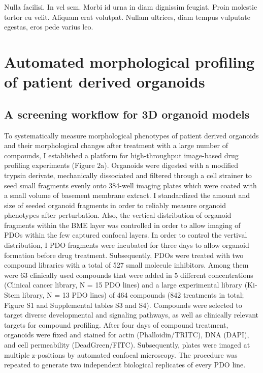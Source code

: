 \begin{savequote}[75mm]
Nulla facilisi. In vel sem. Morbi id urna in diam dignissim feugiat. Proin molestie tortor eu velit. Aliquam erat volutpat. Nullam ultrices, diam tempus vulputate egestas, eros pede varius leo.
\end{savequote}


\chapter{Automated morphological profiling of patient derived organoids}

\section{A screening workflow for 3D organoid models}
To systematically measure morphological phenotypes of patient derived organoids and their morphological changes after treatment with a large number of compounds, I established a platform for high-throughput image-based drug profiling experiments (Figure 2a). Organoids were digested with a modified trypsin derivate, mechanically dissociated and filtered through a cell strainer to seed small fragments evenly onto 384-well imaging plates which were coated with a small volume of basement membrane extract. I standardized the amount and size of seeded organoid fragments in order to reliably measure organoid phenotypes after perturbation.
Also, the vertical distribution of organoid fragments within the BME layer was controlled in order to allow imaging of PDOs within the few captured confocal layers. In order to control the vertival distribution, I 
PDO fragments were incubated for three days to allow organoid formation before drug treatment. 
Subsequently, PDOs were treated with two compound libraries with a total of 527 small molecule inhibitors. Among them were 63 clinically used compounds that were added in 5 different concentrations (Clinical cancer library, N = 15 PDO lines) and a large experimental library (Ki-Stem library, N = 13 PDO lines) of 464 compounds (842 treatments in total; Figure S1 and Supplemental tables S3 and S4). 
Compounds were selected to target diverse developmental and signaling pathways, as well as clinically relevant targets for compound profiling. 
After four days of compound treatment, organoids were fixed and stained for actin (Phalloidin/TRITC), DNA (DAPI), and cell permeability (DeadGreen/FITC). Subsequently, plates were imaged at multiple z-positions by automated confocal microscopy. The procedure was repeated to generate two independent biological replicates of every PDO line.


